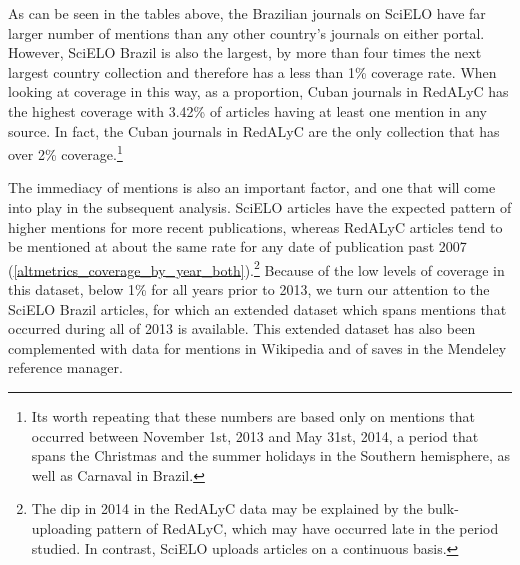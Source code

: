 As can be seen in the tables above, the Brazilian journals on SciELO have far larger number of mentions than any other country's journals on either portal. However, SciELO Brazil is also the largest, by more than four times the next largest country collection and therefore has a less than 1\% coverage rate. When looking at coverage in this way, as a proportion, Cuban journals in RedALyC has the highest coverage with 3.42\% of articles having at least one mention in any source. In fact, the Cuban journals in RedALyC are the only collection that has over 2\% coverage.\footnote{Its worth repeating that these numbers are based only on mentions that occurred between November 1st, 2013 and May 31st, 2014, a period that spans the Christmas and the summer holidays in the Southern hemisphere, as well as Carnaval in Brazil.}

The immediacy of mentions is also an important factor, and one that will come into play in the subsequent analysis. SciELO articles have the expected pattern of higher mentions for more recent publications, whereas RedALyC articles tend to be mentioned at about the same rate for any date of publication past 2007 (\autoref{altmetrics_coverage_by_year_both}).\footnote{The dip in 2014 in the RedALyC data may be explained by the bulk-uploading pattern of RedALyC, which may have occurred late in the period studied. In contrast, SciELO uploads articles on a continuous basis.} Because of the low levels of coverage in this dataset, below 1\% for all years prior to 2013, we turn our attention to the SciELO Brazil articles, for which an extended dataset which spans mentions that occurred during all of 2013 is available. This extended dataset has also been complemented with data for mentions in Wikipedia and of saves in the Mendeley reference manager.



